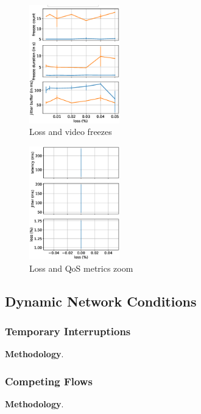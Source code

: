 \begin{figure}[]
    \includegraphics[width=0.35\textwidth,keepaspectratio]{../figures/static/loss_freeze_meet_teams.eps}
    \caption{Loss and video freezes}
    \label{fig:loss_freeze}
\end{figure}


\begin{figure}[]
    \includegraphics[width=0.35\textwidth,keepaspectratio]{../figures/static/loss_latency_zoom.eps}
    \caption{Loss and QoS metrics zoom}
    \label{fig:loss_latency}
\end{figure}


\subsection{Dynamic Network Conditions}

\subsubsection{Temporary Interruptions}

\noindent \textbf{Methodology}.

\subsubsection{Competing Flows}

\noindent \textbf{Methodology}.


